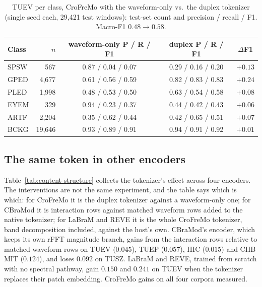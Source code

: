 \begin{table}[t]
\centering
\scriptsize
\caption{TUEV per class, CroFreMo with the waveform-only vs.\ the duplex
tokenizer (single seed each, 29,421 test windows): test-set count and
precision / recall / F1. Macro-F1 $0.48 \to 0.58$.}
\label{tab:perclass}
\begin{tabular}{lrccc}
\toprule
Class & $n$ & waveform-only P / R / F1 & duplex P / R / F1 & $\Delta$F1 \\
\midrule
SPSW & 567 & 0.87 / 0.04 / 0.07 & 0.29 / 0.16 / 0.20 & $+0.13$ \\
GPED & 4,677 & 0.61 / 0.56 / 0.59 & 0.82 / 0.83 / 0.83 & $+0.24$ \\
PLED & 1,998 & 0.48 / 0.53 / 0.50 & 0.63 / 0.54 / 0.58 & $+0.08$ \\
EYEM & 329 & 0.94 / 0.23 / 0.37 & 0.44 / 0.42 / 0.43 & $+0.06$ \\
ARTF & 2,204 & 0.35 / 0.62 / 0.44 & 0.42 / 0.65 / 0.51 & $+0.07$ \\
BCKG & 19,646 & 0.93 / 0.89 / 0.91 & 0.94 / 0.91 / 0.92 & $+0.01$ \\
\bottomrule
\end{tabular}
\end{table}


\subsection{The same token in other encoders}
\label{sec:content-structure}

Table~\ref{tab:content-structure} collects the tokenizer's effect across
four encoders. The interventions are not the same experiment, and the
table says which is which: for CroFreMo it is the duplex tokenizer against
a waveform-only one; for CBraMod it is interaction rows against matched
waveform rows added to the native tokenizer; for LaBraM and REVE it is the
whole CroFreMo tokenizer, band decomposition included, against the host's
own. CBraMod's encoder, which keeps its own rFFT magnitude branch, gains from
the interaction rows relative to matched waveform rows on TUEV ($0.045$),
TUEP ($0.057$), IIIC ($0.015$) and CHB-MIT ($0.124$), and loses $0.092$ on
TUSZ. LaBraM and REVE, trained from scratch with no spectral pathway,
gain $0.150$ and $0.241$ on TUEV when the tokenizer replaces their patch
embedding. CroFreMo gains on all four corpora measured.

